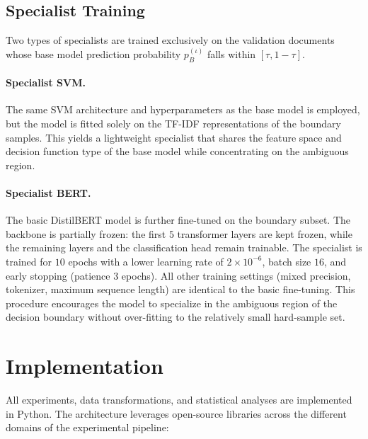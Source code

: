 \documentclass[a4paper,twoside,12pt]{book}
\newcommand{\idx}{\iota}
\newcommand{\mBase}{B}
\newcommand{\thresh}{\tau}
\newcommand{\probSmall}[1]{p_{#1}}
\begin{document}
\subsection{Specialist Training} \label{sec:specialist_training}

Two types of specialists are trained exclusively on the validation documents whose base model prediction probability $\probSmall{\mBase}^{(\idx)}$ falls within $[\thresh, 1-\thresh]$.

\paragraph{Specialist SVM.} The same SVM architecture and hyperparameters as the base model is employed, but the model is fitted solely on the TF-IDF representations of the boundary samples. This yields a lightweight specialist that shares the feature space and decision function type of the base model while concentrating on the ambiguous region.

\paragraph{Specialist BERT.} The basic DistilBERT model is further fine-tuned on the boundary subset. The backbone is partially frozen: the first $5$ transformer layers are kept frozen, while the remaining layers and the classification head remain trainable. The specialist is trained for $10$ epochs with a lower learning rate of $2 \times 10^{-6}$, batch size $16$, and early stopping (patience $3$ epochs). All other training settings (mixed precision, tokenizer, maximum sequence length) are identical to the basic fine-tuning. This procedure encourages the model to specialize in the ambiguous region of the decision boundary without over-fitting to the relatively small hard-sample set.

\section{Implementation}

All experiments, data transformations, and statistical analyses are implemented in Python. The architecture leverages open-source libraries across the different domains of the experimental pipeline:
\end{document}
